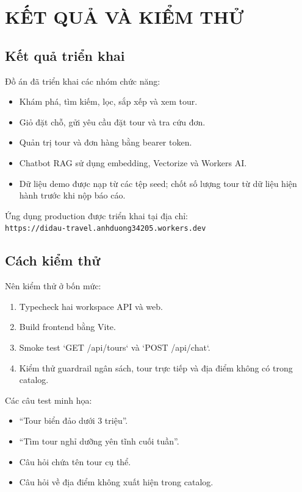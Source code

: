 \chapter{KẾT QUẢ VÀ KIỂM THỬ}

\section{Kết quả triển khai}
Đồ án đã triển khai các nhóm chức năng:
\begin{itemize}
    \item Khám phá, tìm kiếm, lọc, sắp xếp và xem tour.
    \item Giỏ đặt chỗ, gửi yêu cầu đặt tour và tra cứu đơn.
    \item Quản trị tour và đơn hàng bằng bearer token.
    \item Chatbot RAG sử dụng embedding, Vectorize và Workers AI.
    \item Dữ liệu demo được nạp từ các tệp seed; chốt số lượng tour từ dữ liệu hiện hành trước khi nộp báo cáo.
\end{itemize}

Ứng dụng production được triển khai tại địa chỉ:\\
\texttt{https://didau-travel.anhduong34205.workers.dev}

\section{Cách kiểm thử}
Nên kiểm thử ở bốn mức:
\begin{enumerate}
    \item Typecheck hai workspace API và web.
    \item Build frontend bằng Vite.
    \item Smoke test `GET /api/tours` và `POST /api/chat`.
    \item Kiểm thử guardrail ngân sách, tour trực tiếp và địa điểm không có trong catalog.
\end{enumerate}

Các câu test minh họa:
\begin{itemize}
    \item “Tour biển đảo dưới 3 triệu”.
    \item “Tìm tour nghỉ dưỡng yên tĩnh cuối tuần”.
    \item Câu hỏi chứa tên tour cụ thể.
    \item Câu hỏi về địa điểm không xuất hiện trong catalog.
\end{itemize}

